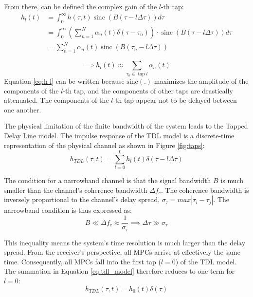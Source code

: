 From there, can be defined the complex gain of the $l$-th tap:
\begin{align}
	h_l(t) &= \int_0^{\infty} h(\tau, t) \operatorname{sinc}(B(\tau-l \Delta \tau)) d \tau \\
	&= \int_0^{\infty} (\sum_{n=1}^{N} \alpha_n(t) \delta(\tau - \tau_n)) \cdot \operatorname{sinc}(B(\tau-l \Delta \tau)) d \tau \\
	 &= \sum_{n=1}^N \alpha_n(t) \operatorname{sinc}\left(B\left(\tau_n-l \Delta \tau\right)\right)
\end{align}

\begin{equation}
	\label{eq:h-l}
	\implies \boxed{h_l(t) \approx \sum_{\tau_n \in \operatorname{tap} l} \alpha_n(t)} 
\end{equation}
Equation \ref{eq:h-l} can be written because $\operatorname{sinc(.)}$ maximizes the amplitude of the components of the  $l$-th tap, and the components of other taps are drastically attenuated. The components of the $l$-th tap appear not to be delayed between one another.

The physical limitation of the finite bandwidth of the system leads to the Tapped Delay Line model. The impulse response of the TDL model is a discrete-time representation of the physical channel as shown in Figure \ref{fig:taps}:
\begin{equation}
	h_{TDL}(\tau, t) = \sum_{l=0}^{L} h_l(t) \delta(\tau - l\Delta\tau)
	\label{eq:tdl_model}
\end{equation}


The condition for a narrowband channel is that the signal bandwidth $B$ is much smaller than the channel's coherence bandwidth $\Delta f_c$. The coherence bandwidth is inversely proportional to the channel's delay spread, $\sigma_\tau = max|\tau_i - \tau_j|$. The narrowband condition is thus expressed as:
\begin{equation}
	B \ll \Delta f_c \approx \frac{1}{\sigma_\tau} \implies \Delta\tau \gg \sigma_\tau
\end{equation}

This inequality means the system's time resolution is much larger than the delay spread. From the receiver's perspective, all MPCs arrive at effectively the same time. Consequently, all MPCs fall into the first tap ($l=0$) of the TDL model. The summation in Equation \ref{eq:tdl_model} therefore reduces to one term for $l=0$:
\begin{equation}
	\label{eq:tdl-narrow}
	h_{TDL}(\tau, t) = h_0(t) \delta(\tau)
\end{equation}

